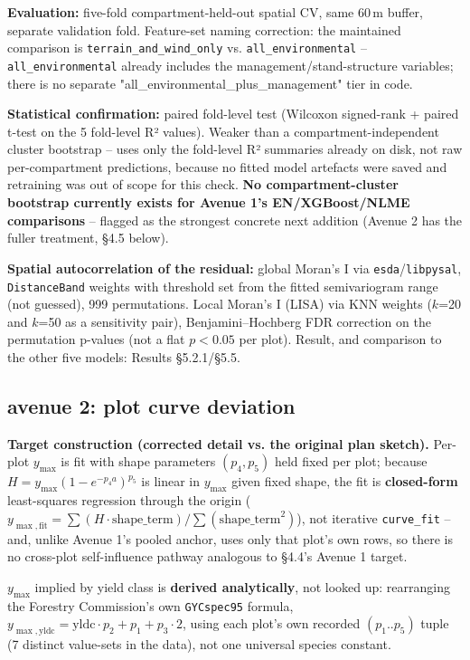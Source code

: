 \textbf{Evaluation:} five-fold compartment-held-out spatial CV, same 60\,m buffer, separate
validation fold. Feature-set naming correction: the maintained comparison is
\texttt{terrain\_and\_wind\_only} vs. \texttt{all\_environmental} -- \texttt{all\_environmental}
already includes the management/stand-structure variables; there is no separate
"all\_environmental\_plus\_management" tier in code.

\textbf{Statistical confirmation:} paired fold-level test (Wilcoxon signed-rank + paired t-test on
the 5 fold-level R² values). Weaker than a compartment-independent cluster bootstrap -- uses only
the fold-level R² summaries already on disk, not raw per-compartment predictions, because no
fitted model artefacts were saved and retraining was out of scope for this check. \textbf{No
compartment-cluster bootstrap currently exists for Avenue 1's EN/XGBoost/NLME comparisons} --
flagged as the strongest concrete next addition (Avenue 2 has the fuller treatment, \S4.5 below).

\textbf{Spatial autocorrelation of the residual:} global Moran's I via \texttt{esda}/\texttt{libpysal},
\texttt{DistanceBand} weights with threshold set from the fitted semivariogram range (not guessed),
999 permutations. Local Moran's I (LISA) via KNN weights ($k$=20 and $k$=50 as a sensitivity pair),
Benjamini--Hochberg FDR correction on the permutation p-values (not a flat $p<0.05$ per plot).
Result, and comparison to the other five models: Results \S5.2.1/\S5.5.

\subsection{avenue 2: plot curve deviation}

\textbf{Target construction (corrected detail vs. the original plan sketch).} Per-plot $y_{\max}$
is fit with shape parameters $(p_4, p_5)$ held fixed per plot; because
$H = y_{\max}(1-e^{-p_4 a})^{p_5}$ is linear in $y_{\max}$ given fixed shape, the fit is
\textbf{closed-form} least-squares regression through the origin
($y_{\max,\text{fit}} = \sum(H\cdot\text{shape\_term}) / \sum(\text{shape\_term}^2)$), not
iterative \texttt{curve\_fit} -- and, unlike Avenue 1's pooled anchor, uses only that plot's own
rows, so there is no cross-plot self-influence pathway analogous to \S4.4's Avenue 1 target.

$y_{\max}$ implied by yield class is \textbf{derived analytically}, not looked up: rearranging the
Forestry Commission's own \texttt{GYCspec95} formula,
$y_{\max,\text{yldc}} = \text{yldc}\cdot p_2 + p_1 + p_3\cdot 2$, using each plot's own recorded
$(p_1..p_5)$ tuple (7 distinct value-sets in the data), not one universal species constant.

